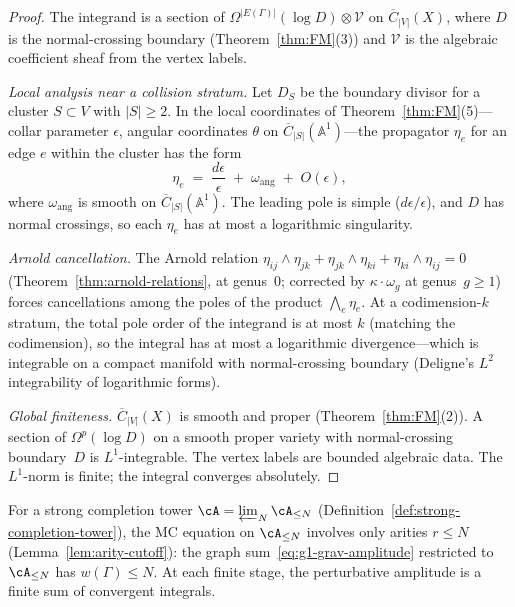 \begin{proof}
The integrand is a section of
$\Omega^{|E(\Gamma)|}(\log D) \otimes \mathcal{V}$ on
$\overline{C}_{|V|}(X)$, where $D$ is the normal-crossing
boundary (Theorem~\ref{thm:FM}(3)) and $\mathcal{V}$ is the
algebraic coefficient sheaf from the vertex labels.

\emph{Local analysis near a collision stratum.}
Let $D_S$ be the boundary divisor for a cluster $S \subset V$
with $|S| \geq 2$.  In the local coordinates of
Theorem~\ref{thm:FM}(5)---collar parameter $\epsilon$,
angular coordinates $\theta$ on
$\overline{C}_{|S|}(\mathbb{A}^1)$---the propagator
$\eta_e$ for an edge $e$ within the cluster has the form
\begin{equation}\label{eq:g1-local-eta}
\eta_e
\;=\;
\frac{d\epsilon}{\epsilon}
\;+\;
\omega_{\mathrm{ang}}
\;+\;
O(\epsilon),
\end{equation}
where $\omega_{\mathrm{ang}}$ is smooth on
$\overline{C}_{|S|}(\mathbb{A}^1)$.  The leading pole is simple
($d\epsilon/\epsilon$), and $D$ has normal crossings, so each
$\eta_e$ has at most a logarithmic singularity.

\emph{Arnold cancellation.}
The Arnold relation $\eta_{ij} \wedge \eta_{jk} +
\eta_{jk} \wedge \eta_{ki} + \eta_{ki} \wedge \eta_{ij} = 0$
(Theorem~\ref{thm:arnold-relations}, at genus~$0$; corrected by
$\kappa \cdot \omega_g$ at genus~$g \geq 1$) forces cancellations
among the poles of the product $\bigwedge_e \eta_e$.  At a
codimension-$k$ stratum, the total pole order of the integrand
is at most $k$ (matching the codimension), so the
integral has at most a logarithmic divergence---which is
integrable on a compact manifold with normal-crossing boundary
(Deligne's $L^2$ integrability of logarithmic forms).

\emph{Global finiteness.}
$\overline{C}_{|V|}(X)$ is smooth and proper
(Theorem~\ref{thm:FM}(2)).  A section of $\Omega^p(\log D)$ on
a smooth proper variety with normal-crossing boundary~$D$ is
$L^1$-integrable.  The vertex labels are bounded algebraic data.
The $L^1$-norm is finite; the integral converges absolutely.
\end{proof}

\begin{proposition}%
\label{prop:g1-arity-cutoff}%
%
For a strong completion tower $\cA = \varprojlim_N \cA_{\leq N}$
\textup{(}Definition~\textup{\ref{def:strong-completion-tower})},
the MC equation on $\cA_{\leq N}$ involves only arities
$r \leq N$
\textup{(}Lemma~\textup{\ref{lem:arity-cutoff})}:
the graph sum~\eqref{eq:g1-grav-amplitude} restricted to
$\cA_{\leq N}$ has $w(\Gamma) \leq N$.
At each finite stage, the perturbative amplitude is a finite
sum of convergent integrals.
\end{proposition}

